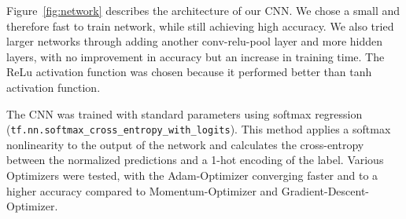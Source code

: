 \documentclass{article}
\def\code#1{\texttt{#1}}
\begin{document}
\begin{enumerate}
	\begin{item}
		Figure~\ref{fig:network} describes the architecture of our CNN. We chose a small and therefore fast to train network, while still achieving high accuracy. We also tried larger networks through adding another conv-relu-pool layer and more hidden layers, with no improvement in accuracy but an increase in training time. The ReLu activation function was chosen because it performed better than tanh activation function.
	\end{item}
	\begin{item}
		The CNN was trained with standard parameters using softmax regression (\code{tf.nn.softmax\_cross\_entropy\_with\_logits}). This method applies a softmax nonlinearity to the output of the network and calculates the cross-entropy between the normalized predictions and a 1-hot encoding of the label. Various Optimizers were tested, with the Adam-Optimizer converging faster and to a higher accuracy compared to Momentum-Optimizer and Gradient-Descent-Optimizer.
	\end{item}


\end{enumerate}
\end{document}
